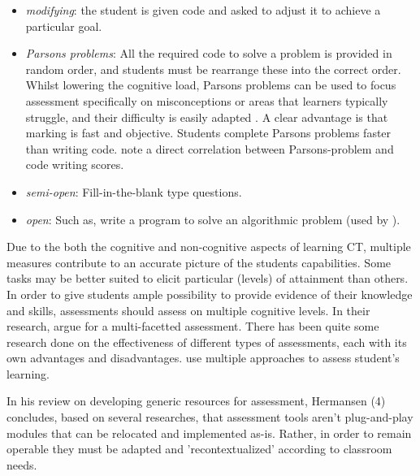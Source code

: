 \begin{itemize}
\item \emph{modifying}: the student is given code and asked to adjust it to achieve a particular goal.
\item \emph{Parsons problems}: All the required code to solve a problem is provided in random order, and students must be rearrange these into the correct order. Whilst lowering the cognitive load, Parsons problems can be used to focus assessment specifically on misconceptions or areas that learners typically struggle, and their difficulty is easily adapted \cite{ericson2017parsons}. A clear advantage is that marking is fast and objective. Students complete Parsons problems faster than writing code.  note a direct correlation between Parsons-problem and code writing scores.
\item \emph{semi-open}: Fill-in-the-blank type questions. 
\item \emph{open}: Such as, write a program to solve an algorithmic problem (used by ).
\end{itemize}



Due to the both the cognitive and non-cognitive aspects of learning CT, multiple measures contribute to an accurate picture of the students capabilities. Some tasks may be better suited to elicit particular (levels) of attainment than others. In order to give students ample possibility to provide evidence of their knowledge and skills, assessments should assess on multiple cognitive levels. In their research,  argue for a multi-facetted assessment. There has been quite some research done on the effectiveness of different types of assessments, each with its own advantages and disadvantages.  use multiple approaches to assess student's learning.




In his review on developing generic resources for assessment, Hermansen (\cite{hermansen2014reworking}4) concludes, based on several researches, that assessment tools aren't plug-and-play modules that can be relocated and implemented as-is. Rather, in order to remain operable they must be adapted and 'recontextualized' according to classroom needs.


